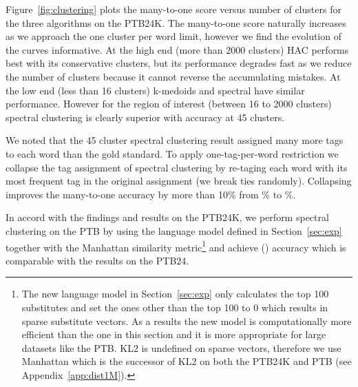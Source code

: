 Figure~\ref{fig:clustering} plots the many-to-one score versus number
of clusters for the three algorithms on the PTB24K.  The many-to-one
score naturally increases as we approach the one cluster per word
limit, however we find the evolution of the curves informative.  At
the high end (more than 2000 clusters) HAC performs best with its
conservative clusters, but its performance degrades fast as we reduce
the number of clusters because it cannot reverse the accumulating
mistakes.  At the low end (less than 16 clusters) k-medoids and
spectral have similar performance.  However for the region of interest
(between 16 to 2000 clusters) spectral clustering is clearly superior
with \spectralResult \mto accuracy at 45 clusters.

We noted that the 45 cluster spectral clustering result assigned many
more tags to each word than the gold standard.  To apply
one-tag-per-word restriction we collapse the tag assignment of
spectral clustering by re-taging each word with its most frequent tag
in the original assignment (we break ties randomly).  Collapsing
improves the many-to-one accuracy by more than 10\% from
\spectralResult\% to \collapseResult\%.

In accord with the findings and results on the PTB24K, we perform
spectral clustering on the PTB by using the language model defined in
Section~\ref{sec:exp} together with the Manhattan similarity
metric\footnote{The new language model in Section~\ref{sec:exp} only
  calculates the top 100 substitutes and set the ones other than the
  top 100 to 0 which results in sparse substitute vectors.  As a
  results the new model is computationally more efficient than the one
  in this section and it is more appropriate for large datasets like
  the PTB.  KL2 is undefined on sparse vectors, therefore we use
  Manhattan which is the successor of KL2 on both the PTB24K and PTB
  (see Appendix~\ref{app:dist1M}).}  and achieve \spectralResultPTB
\mto (\collapseResultPTB \vm) accuracy which is comparable with the
results on the PTB24.



